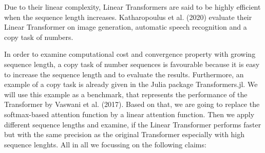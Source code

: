 \documentclass[DIV=13,fontsize=11pt]{scrartcl}
\begin{document}
    


Due to their linear complexity, Linear Transformers are said to be highly efficient when the sequence length increases. Katharopoulus et al. (2020) evaluate their Linear Transformer on image generation, automatic speech recognition and a copy task of numbers.

 In order to examine computational cost and convergence property with growing sequence length, a copy task of number sequences is favourable because it is easy to increase the sequence length and to evaluate the results. Furthermore, an example of a copy task is already given in the Julia package Transformers.jl. We will use this example as a benchmark, that represents the performance of the Transformer by Vaswani et al. (2017). Based on that, we are going to replace the softmax-based attention function by a linear attention function. Then we apply different sequence lengths and examine, if the Linear Transformer performs faster but with the same precision as the original Transformer especially with high sequence lenghts. 
All in all we focussing on the following claims:
\end{document}
